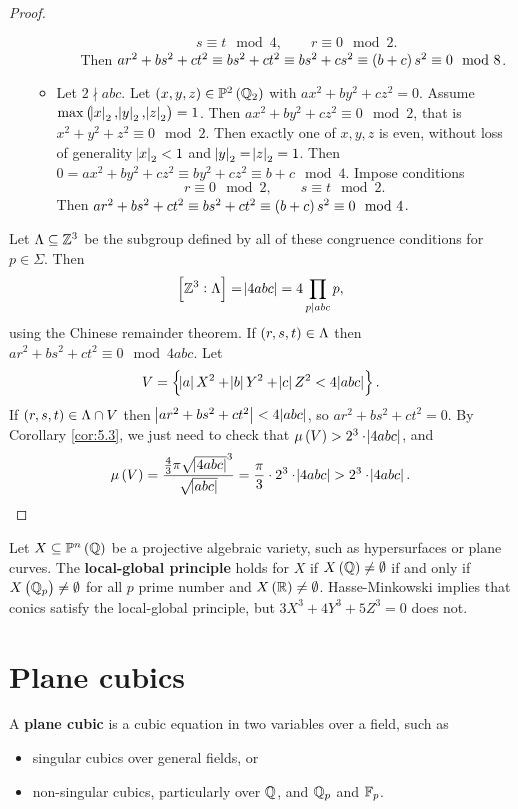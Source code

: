 \begin{proof}
\begin{itemize}
\begin{itemize}
\begin{itemize}
$$ s \equiv t \mod 4, \qquad r \equiv 0 \mod 2. $$
Then $ ar^2 + bs^2 + ct^2 \equiv bs^2 + ct^2 \equiv bs^2 + cs^2 \equiv \br{b + c}s^2 \equiv 0 \mod 8 $.
\end{itemize}
\item Let $ 2 \nmid abc $. Let $ \br{x, y, z} \in \PP^2\br{\QQ_2} $ with $ ax^2 + by^2 + cz^2 = 0 $. Assume $ \max\br{\abs{x}_2, \abs{y}_2, \abs{z}_2} = 1 $. Then $ ax^2 + by^2 + cz^2 \equiv 0 \mod 2 $, that is $ x^2 + y^2 + z^2 \equiv 0 \mod 2 $. Then exactly one of $ x, y, z $ is even, without loss of generality $ \abs{x}_2 < 1 $ and $ \abs{y}_2 = \abs{z}_2 = 1 $. Then $ 0 = ax^2 + by^2 + cz^2 \equiv by^2 + cz^2 \equiv b + c \mod 4 $. Impose conditions
$$ r \equiv 0 \mod 2, \qquad s \equiv t \mod 2. $$
Then $ ar^2 + bs^2 + ct^2 \equiv bs^2 + ct^2 \equiv \br{b + c}s^2 \equiv 0 \mod 4 $.
\end{itemize}
\end{itemize}
Let $ \Lambda \subseteq \mathbb{Z}^3 $ be the subgroup defined by all of these congruence conditions for $ p \in \Sigma $. Then
$$ \sbr{\ZZ^3 : \Lambda} = \abs{4abc} = 4\prod_{p \mid abc} p, $$
using the Chinese remainder theorem. If $ \br{r, s, t} \in \Lambda $ then $ ar^2 + bs^2 + ct^2 \equiv 0 \mod 4abc $. Let
$$ V = \cbr{\abs{a}X^2 + \abs{b}Y^2 + \abs{c}Z^2 < 4\abs{abc}}. $$
If $ \br{r, s, t} \in \Lambda \cap V $ then $ \abs{ar^2 + bs^2 + ct^2} < 4\abs{abc} $, so $ ar^2 + bs^2 + ct^2 = 0 $. By Corollary \ref{cor:5.3}, we just need to check that $ \mu\br{V} > 2^3 \cdot \abs{4abc} $, and
$$ \mu\br{V} = \dfrac{\tfrac{4}{3}\pi\sqrt{\abs{4abc}}^3}{\sqrt{\abs{abc}}} = \dfrac{\pi}{3} \cdot 2^3 \cdot \abs{4abc} > 2^3 \cdot \abs{4abc}. $$
\end{proof}

Let $ X \subseteq \PP^n\br{\QQ} $ be a projective algebraic variety, such as hypersurfaces or plane curves. The \textbf{local-global principle} holds for $ X $ if $ X\br{\QQ} \ne \emptyset $ if and only if $ X\br{\QQ_p} \ne \emptyset $ for all $ p $ prime number and $ X\br{\RR} \ne \emptyset $. Hasse-Minkowski implies that conics satisfy the local-global principle, but $ 3X^3 + 4Y^3 + 5Z^3 = 0 $ does not.

\pagebreak

\section{Plane cubics}


\begin{definition}
A \textbf{plane cubic} is a cubic equation in two variables over a field, such as
\begin{itemize}
\item singular cubics over general fields, or
\item non-singular cubics, particularly over $ \mathbb{Q} $, and $ \mathbb{Q}_p $ and $ \mathbb{F}_p $.
\end{itemize}
\end{definition}

